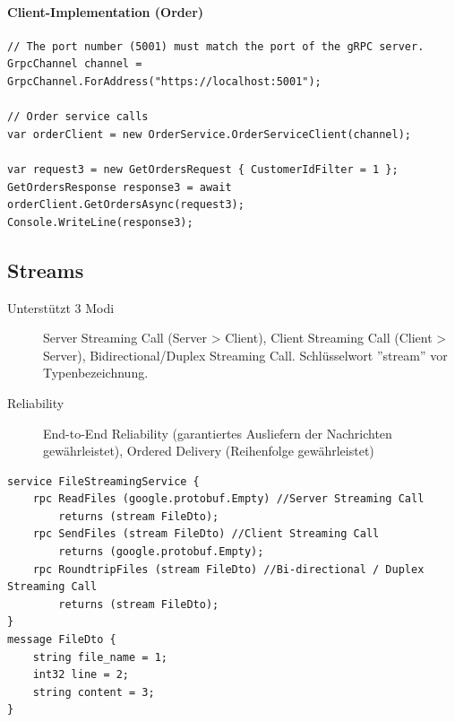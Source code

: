 \documentclass[
a4paper,
oneside,
10pt,
fleqn,
headsepline,
toc=listofnumbered, 
bibliography=totocnumbered]{scrartcl}
\begin{document}
\paragraph{Client-Implementation (Order)}
\begin{lstlisting}
// The port number (5001) must match the port of the gRPC server.
GrpcChannel channel = GrpcChannel.ForAddress("https://localhost:5001");

// Order service calls
var orderClient = new OrderService.OrderServiceClient(channel);

var request3 = new GetOrdersRequest { CustomerIdFilter = 1 };
GetOrdersResponse response3 = await orderClient.GetOrdersAsync(request3);
Console.WriteLine(response3);
\end{lstlisting}

\subsection{Streams}
\begin{description}
	\item[Unterstützt 3 Modi] Server Streaming Call (Server > Client), Client Streaming Call (Client > Server), Bidirectional/Duplex Streaming Call. Schlüsselwort ''stream'' vor Typenbezeichnung.
	\item[Reliability] End-to-End Reliability (garantiertes Ausliefern der Nachrichten gewährleistet), Ordered Delivery (Reihenfolge gewährleistet)
\end{description}
\begin{lstlisting}
service FileStreamingService {
    rpc ReadFiles (google.protobuf.Empty) //Server Streaming Call
        returns (stream FileDto);
    rpc SendFiles (stream FileDto) //Client Streaming Call
        returns (google.protobuf.Empty);
    rpc RoundtripFiles (stream FileDto) //Bi-directional / Duplex Streaming Call
        returns (stream FileDto);
}
message FileDto {
    string file_name = 1;
    int32 line = 2;
    string content = 3;
}
\end{lstlisting}
\end{document}
